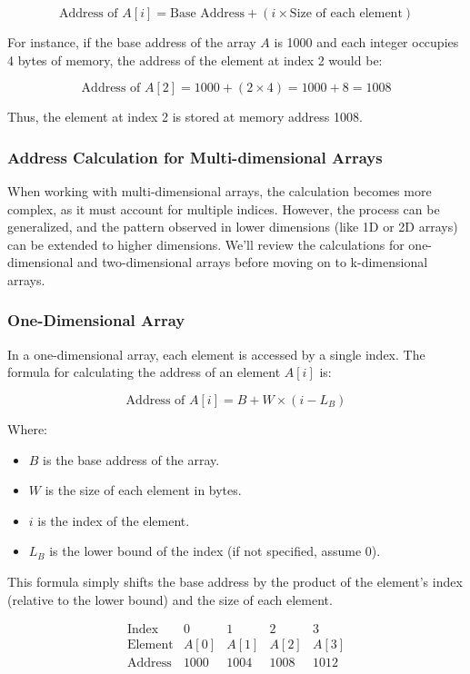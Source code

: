 \documentclass{book}
\begin{document}
\[
\text{Address of } A[i] = \text{Base Address} + (i \times \text{Size of each element})
\]

For instance, if the base address of the array \( A \) is 1000 and each integer occupies 4 bytes of memory, the address of the element at index 2 would be:

\[
\text{Address of } A[2] = 1000 + (2 \times 4) = 1000 + 8 = 1008
\]

Thus, the element at index 2 is stored at memory address 1008.

\subsubsection{Address Calculation for Multi-dimensional Arrays}

When working with multi-dimensional arrays, the calculation becomes more complex, as it must account for multiple indices. However, the process can be generalized, and the pattern observed in lower dimensions (like 1D or 2D arrays) can be extended to higher dimensions. We'll review the calculations for one-dimensional and two-dimensional arrays before moving on to k-dimensional arrays.

\subsubsection{One-Dimensional Array}

In a one-dimensional array, each element is accessed by a single index. The formula for calculating the address of an element \( A[i] \) is:

\[
\text{Address of } A[i] = B + W \times (i - L_B)
\]

Where:
\begin{itemize}
	\item \( B \) is the base address of the array.
	\item \( W \) is the size of each element in bytes.
	\item \( i \) is the index of the element.
	\item \( L_B \) is the lower bound of the index (if not specified, assume 0).
\end{itemize}

This formula simply shifts the base address by the product of the element's index (relative to the lower bound) and the size of each element.

\[
\begin{array}{c|c|c|c|c}
	\text{Index} & 0 & 1 & 2 & 3 \\
	\hline
	\text{Element} & A[0] & A[1] & A[2] & A[3] \\
	\hline
	\text{Address} & 1000 & 1004 & 1008 & 1012 \\
\end{array}
\]
\end{document}
